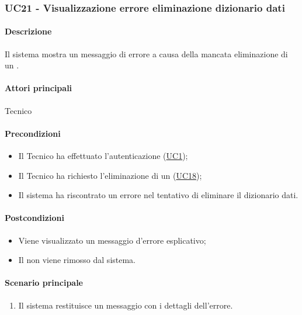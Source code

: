 \subsubsection{UC21 - Visualizzazione errore eliminazione dizionario dati}\label{UC21}
\paragraph*{Descrizione}
Il sistema mostra un messaggio di errore a causa della mancata eliminazione di un .

\paragraph*{Attori principali}
Tecnico

\paragraph*{Precondizioni}
\begin{itemize}
  \item Il Tecnico ha effettuato l'autenticazione (\hyperref[UC1]{UC1});
  \item Il Tecnico ha richiesto l'eliminazione di un  (\hyperref[UC18]{UC18});
  \item Il sistema ha riscontrato un errore nel tentativo di eliminare il dizionario dati.
\end{itemize}

\paragraph*{Postcondizioni}
\begin{itemize}
  \item Viene visualizzato un messaggio d'errore esplicativo;
  \item Il  non viene rimosso dal sistema.
\end{itemize}

\paragraph*{Scenario principale}
\begin{enumerate}
  \item Il sistema restituisce un messaggio con i dettagli dell'errore.
\end{enumerate}